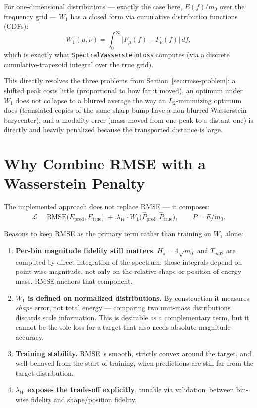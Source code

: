 \documentclass[11pt,a4paper]{article}
\begin{document}
For one-dimensional distributions — exactly the case here, $E(f)/m_0$ over
the frequency grid — $W_1$ has a closed form via cumulative distribution
functions (CDFs):
\begin{equation}
W_1(\mu,\nu) = \int_{0}^{\infty} \big| F_\mu(f) - F_\nu(f) \big| \, df,
\end{equation}
which is exactly what \texttt{SpectralWassersteinLoss} computes
(via a discrete cumulative-trapezoid integral over the true grid).

This directly resolves the three problems from Section~\ref{sec:rmse-problem}:
a shifted peak costs little (proportional to how far it moved), an
optimum under $W_1$ does not collapse to a blurred average the way an
$L_2$-minimizing optimum does (translated copies of the same sharp bump
have a non-blurred Wasserstein barycenter), and a modality error (mass moved
from one peak to a distant one) is directly and heavily penalized because
the transported distance is large.

\section{Why Combine RMSE with a Wasserstein Penalty}
\label{sec:hybrid}

The implemented approach does not replace RMSE — it composes:
\begin{equation}
\mathcal{L} = \text{RMSE}\big(E_{\text{pred}}, E_{\text{true}}\big)
\;+\; \lambda_W \cdot W_1\big(\hat P_{\text{pred}}, \hat P_{\text{true}}\big),
\qquad \hat P = E/m_0.
\end{equation}

Reasons to keep RMSE as the primary term rather than training on $W_1$ alone:

\begin{enumerate}[leftmargin=1.4em]
\item \textbf{Per-bin magnitude fidelity still matters.} $H_s = 4\sqrt{m_0}$
and $T_{m02}$ are computed by direct integration of the spectrum; those
integrals depend on point-wise magnitude, not only on the relative shape or
position of energy mass. RMSE anchors that component.
\item \textbf{$W_1$ is defined on normalized distributions.} By
construction it measures \emph{shape} error, not total energy — comparing
two unit-mass distributions discards scale information. This is desirable
as a complementary term, but it cannot be the sole loss for a target that
also needs absolute-magnitude accuracy.
\item \textbf{Training stability.} RMSE is smooth, strictly convex around
the target, and well-behaved from the start of training, when predictions
are still far from the target distribution.
\item \textbf{$\lambda_W$ exposes the trade-off explicitly}, tunable via
validation, between bin-wise fidelity and shape/position fidelity.
\end{enumerate}
\end{document}
